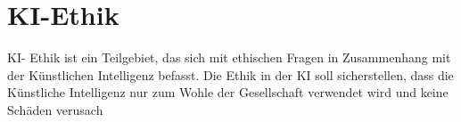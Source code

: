 \section{KI-Ethik}
\label{sec:data}

KI- Ethik ist ein Teilgebiet, das sich mit ethischen Fragen in Zusammenhang mit der Künstlichen
Intelligenz befasst. Die Ethik in der KI soll sicherstellen, dass die Künstliche Intelligenz nur zum
Wohle der Gesellschaft verwendet wird und keine Schäden verusach